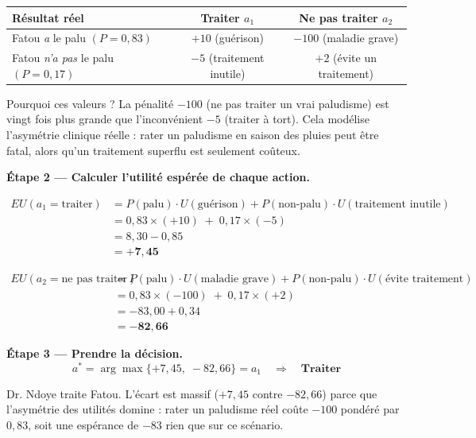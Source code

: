 \documentclass[11pt,a4paper]{article}
\begin{document}
\begin{center}
\renewcommand{\arraystretch}{1.4}
\begin{tabular}{lcc}
\toprule
\textbf{Résultat réel} & \textbf{Traiter} $a_1$ & \textbf{Ne pas traiter} $a_2$ \\
\midrule
Fatou \textit{a} le palu \quad $(P = 0{,}83)$ & $+10$ {\small (guérison)} & $-100$ {\small (maladie grave)} \\
Fatou \textit{n'a pas} le palu \quad $(P = 0{,}17)$ & $-5$  {\small (traitement inutile)} & $+2$ {\small (évite un traitement)} \\
\bottomrule
\end{tabular}
\end{center}

Pourquoi ces valeurs ? La pénalité $-100$ (ne pas traiter un vrai paludisme) est vingt fois plus grande que l'inconvénient $-5$ (traiter à tort). Cela modélise l'asymétrie clinique réelle : rater un paludisme en saison des pluies peut être fatal, alors qu'un traitement superflu est seulement coûteux.

\medskip
\textbf{Étape 2 --- Calculer l'utilité espérée de chaque action.}

\begin{align*}
EU(a_1 = \text{traiter})
  &= P(\text{palu}) \cdot U(\text{guérison})
   + P(\text{non-palu}) \cdot U(\text{traitement inutile}) \\
  &= 0{,}83 \times (+10)\; + \;0{,}17 \times (-5) \\
  &= 8{,}30 - 0{,}85 \\[3pt]
  &= \mathbf{+7{,}45}
\end{align*}

\begin{align*}
EU(a_2 = \text{ne pas traiter})
  &= P(\text{palu}) \cdot U(\text{maladie grave})
   + P(\text{non-palu}) \cdot U(\text{évite traitement}) \\
  &= 0{,}83 \times (-100) \;+\; 0{,}17 \times (+2) \\
  &= -83{,}00 + 0{,}34 \\[3pt]
  &= \mathbf{-82{,}66}
\end{align*}

\textbf{Étape 3 --- Prendre la décision.}
$$a^* = \arg\max\{+7{,}45,\; -82{,}66\} = a_1 \quad \Rightarrow \quad \textbf{Traiter}$$

Dr. Ndoye traite Fatou. L'écart est massif ($+7{,}45$ contre $-82{,}66$) parce que l'asymétrie des utilités domine : rater un paludisme réel coûte $-100$ pondéré par $0{,}83$, soit une espérance de $-83$ rien que sur ce scénario.
\end{document}
